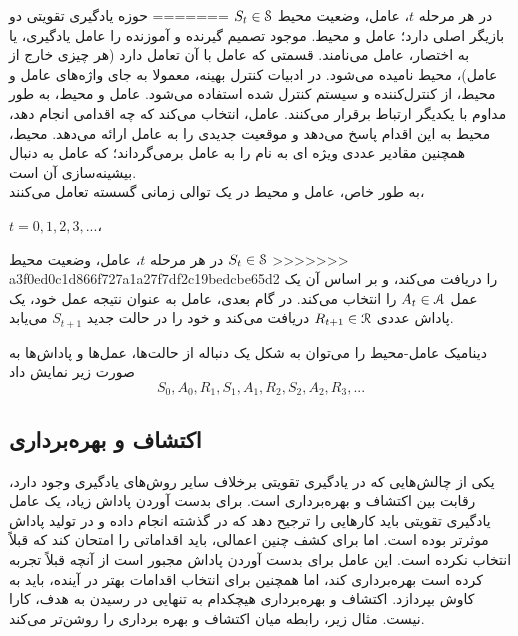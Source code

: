 در هر مرحله $t$، عامل، وضعیت محیط  
$S_t \in \EuScript{S}$
=======
حوزه یادگیری تقویتی  دو بازیگر اصلی دارد؛ عامل و محیط. موجود تصمیم گیرنده و آموزنده را عامل یادگیری، یا به اختصار، عامل می‌نامند. قسمتی که عامل با آن تعامل دارد (هر چیزی خارج از عامل)، محیط نامیده می‌شود. در ادبیات کنترل بهینه، معمولا به جای واژه‌های عامل و محیط، از  کنترل‌کننده 
و سیستم کنترل شده  استفاده می‌شود.
عامل و محیط، به طور مداوم با یکدیگر ارتباط برقرار می‌کنند. عامل، انتخاب می‌کند که چه اقدامی‌ انجام دهد، محیط به این اقدام پاسخ می‌دهد و موقعیت جدیدی را به عامل ارائه می‌دهد.
محیط، همچنین مقادیر عددی ویژه ای به نام  را به عامل برمی‌گرداند؛ که عامل به دنبال بیشینه‌سازی آن است.
\\به طور خاص، عامل و محیط در یک توالی زمانی گسسته تعامل می‌کنند، 
\begin{latin}$t = 0,1,2,3,...$،\end{latin}
در هر مرحله $t$، عامل، وضعیت محیط $S_t \in \EuScript{S}$
>>>>>>> a3f0ed0c1d866f727a1a27f7df2c19bedcbe65d2
را دریافت می‌کند، و بر اساس آن یک عمل 
$A_t \in \EuScript{A}$
را انتخاب می‌کند. در گام بعدی، عامل به عنوان نتیجه عمل خود، یک پاداش عددی $R_{t+1} \in \EuScript{R}$ دریافت می‌کند و خود را در حالت جدید $S_{t+1}$ می‌یابد\cite{suttonbook}.


دینامیک عامل-محیط را می‌توان به شکل یک دنباله از حالت‌ها، عمل‌ها و پاداش‌ها به صورت زیر نمایش داد
$$S_0, A_0, R_1, S_1, A_1, R_2, S_2, A_2, R_3,...$$
\subsection*{اکتشاف و بهره‌برداری}
یکی از چالش‌هایی که در یادگیری تقویتی برخلاف سایر روش‌های یادگیری وجود دارد، رقابت بین اکتشاف و بهره‌برداری است. برای بدست آوردن پاداش زیاد، یک عامل یادگیری تقویتی باید کارهایی را ترجیح دهد که در گذشته انجام داده و در تولید پاداش موثرتر بوده است. اما برای کشف چنین اعمالی، باید اقداماتی را امتحان کند که قبلاً انتخاب نکرده است. این عامل برای بدست آوردن پاداش مجبور است از آنچه قبلاً تجربه کرده است بهره‌برداری کند، اما همچنین برای انتخاب اقدامات بهتر در آینده، باید به کاوش بپردازد. 
اکتشاف و بهره‌برداری هیچکدام به تنهایی در رسیدن به هدف، کارا نیست. مثال زیر، رابطه میان اکتشاف و بهره برداری را روشن‌تر می‌کند.
